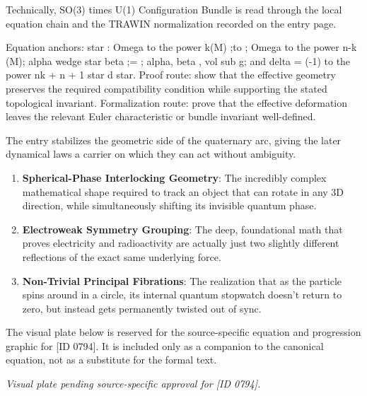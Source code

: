 Technically, SO(3) times U(1) Configuration Bundle is read through the local equation chain and the TRAWIN normalization recorded on the entry page.

Equation anchors: star : Omega to the power k(M) ;to ; Omega to the power n-k (M); alpha wedge star beta ;= ; alpha, beta , vol sub g; and delta = (-1) to the power nk + n + 1 star d star. Proof route: show that the effective geometry preserves the required compatibility condition while supporting the stated topological invariant. Formalization route: prove that the effective deformation leaves the relevant Euler characteristic or bundle invariant well-defined.

The entry stabilizes the geometric side of the quaternary arc, giving the later dynamical laws a carrier on which they can act without ambiguity.
\endgroup

\begin{enumerate}[leftmargin=1.6em,itemsep=6pt,topsep=4pt]
\item \textbf{Spherical-Phase Interlocking Geometry}: The incredibly complex mathematical shape required to track an object that can rotate in any 3D direction, while simultaneously shifting its invisible quantum phase.
\item \textbf{Electroweak Symmetry Grouping}: The deep, foundational math that proves electricity and radioactivity are actually just two slightly different reflections of the exact same underlying force.
\item \textbf{Non-Trivial Principal Fibrations}: The realization that as the particle spins around in a circle, its internal quantum stopwatch doesn't return to zero, but instead gets permanently twisted out of sync.
\end{enumerate}

\begingroup\footnotesize\sloppy
The visual plate below is reserved for the source-specific equation and progression graphic for [ID 0794]. It is included only as a companion to the canonical equation, not as a substitute for the formal text.
\par\endgroup
\begingroup\footnotesize\itshape
Visual plate pending source-specific approval for [ID 0794].
\par\endgroup

